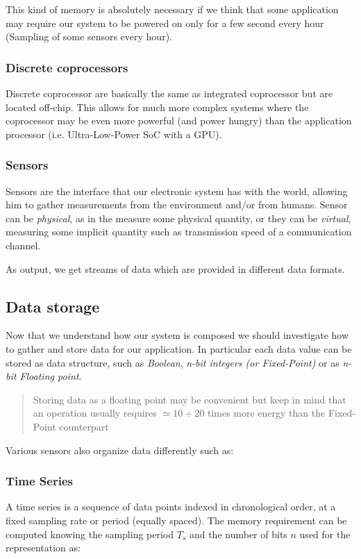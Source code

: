 \documentclass{article}
\begin{document}
        This kind of memory is absolutely necessary if we think that some application may require our system to be powered on only for a few second every hour (Sampling of some sensors every hour).

      \subsubsection{Discrete coprocessors}
        Discrete coprocessor are basically the same as integrated coprocessor but are located off-chip. This allows for much more complex systems where the coprocessor may be
        even more powerful (and power hungry) than the application processor (i.e. Ultra-Low-Power SoC with a GPU).

      \subsubsection{Sensors}
        Sensors are the interface that our electronic system has with the world, allowing him to gather measurements from the environment and/or from humans. Sensor can be \emph{physical}, as in the measure some physical quantity, or they can be \emph{virtual}, measuring some implicit quantity such as
        transmission speed of a communication channel.

        As output, we get streams of data which are provided in different data formats.

    \subsection{Data storage}
      Now that we understand how our system is composed we should investigate how to gather and store data for our application. In particular each data value can be stored as data structure, such as \emph{Boolean}, \emph{n-bit integers (or Fixed-Point)} or as \emph{n-bit Floating point}.
      
      \begin{quote}
        Storing data as a floating point may be convenient but keep in mind that an operation usually requires $\simeq 10\div 20$ times more energy than the Fixed-Point counterpart
      \end{quote}

      Various sensors also organize data differently such as:
      \subsubsection{Time Series}
        A time series is a sequence of data points indexed in chronological order, at a fixed sampling rate or period (equally spaced). The memory requirement can be computed knowing the sampling period $T_s$ and the number of bits $n$ used for the representation as:
\end{document}
